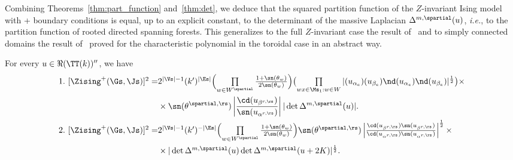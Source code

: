 \documentclass[a4paper,twoside,11pt]{article}
\begin{document}
Combining Theorems~\ref{thm:part_function} and~\ref{thm:det}, we deduce that the squared partition function of the $Z$-invariant Ising model
with + boundary conditions is equal, up to an explicit constant, to the determinant of the massive Laplacian $\Delta^{m,\spartial}(u)$,
\emph{i.e.}, to the partition function of rooted directed spanning forests. This generalizes to the full $Z$-invariant case 
the result of~\cite{deTiliere:mapping,deTiliere:partition} and to simply connected domains the result of~\cite{BdtR2} proved 
for the characteristic polynomial in the toroidal case in an abstract way.
\begin{cor}\label{cor:partition_function}
For every $u\in\Re(\TT(k))''$, we have
\begin{align*}\textstyle 
1.\ [\Zising^+(\Gs,\Js)]^2 =&\textstyle2^{|\Vs|-1}(k')^{|\Es|}
\Bigl(\prod\limits_{w\in W^\spartial}\frac{1+\sn(\theta_w)}{2\sn(\theta_w)}\Bigr)
\bigl(\prod\limits_{wx\in\Ms_1:w\in W}|\sc(u_{\alpha_e})\sc(u_{\beta_e})\nd(u_{\alpha_e})\nd(u_{\beta_e})|^{\frac{1}{2}}\bigr)\times\\
\textstyle &\times \sn(\theta^{\spartial,\rs})\left|\frac{\cd(u_{\beta^{r,\rs}})}{\sn(u_{\alpha^{r,\rs}})}\right|
|\det \Delta^{m,\spartial}(u)|.\\
\textstyle 2.\ [\Zising^+(\Gs,\Js)]^2=&\textstyle2^{|\Vs|-1}(k')^{-|\Es|}
\Bigl(\prod\limits_{w\in W^\spartial}\frac{1+\sn(\theta_w)}{2\sn(\theta_w)}\Bigr)
\sn(\theta^{\spartial,\rs})
\left|\frac{\cd(u_{\beta^{r,\rs}})\sn(u_{\beta^{r,\rs}})}{
\cd(u_{\alpha^{r,\rs}})\sn(u_{\alpha^{r,\rs}})}\right|^{\frac{1}{2}}\times\\
&\textstyle \times |\det \Delta^{m,\spartial}(u)\det \Delta^{m,\spartial}(u+2K)|^{\frac{1}{2}}.
\end{align*}
\end{cor}
\end{document}
